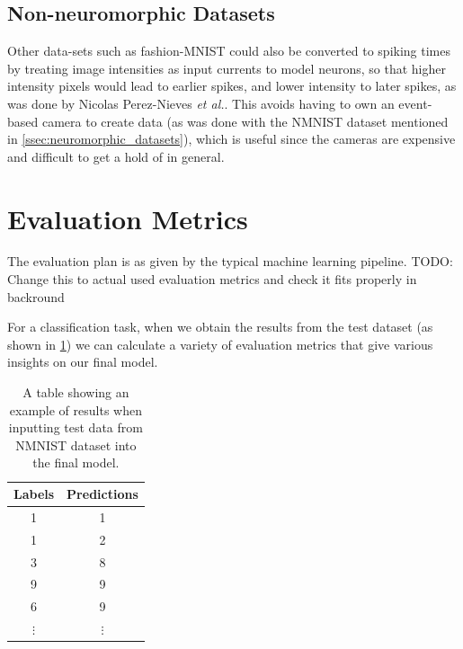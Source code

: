 \subsection{Non-neuromorphic Datasets}

Other data-sets such as fashion-MNIST could also be converted to spiking times by treating image intensities as input currents to model neurons, so that higher intensity pixels would lead to earlier spikes, and lower intensity to later spikes, as was done by Nicolas Perez-Nieves \textit{et al.}\cite{NeuralHetroPromRobLearn}. This avoids having to own an event-based camera to create data (as was done with the NMNIST dataset mentioned in \cref{ssec:neuromorphic_datasets}), which is useful since the cameras are expensive and difficult to get a hold of in general.

\section{Evaluation Metrics} \label{sec:evalutaion_metrics}

The evaluation plan is as given by the typical machine learning pipeline\cite{IntroToML}. \color{red} TODO: Change this to actual used evaluation metrics and check it fits properly in backround \color{black}

For a classification task, when we obtain the results from the test dataset (as shown in \cref{tab:possible_results}) we can calculate a variety of evaluation metrics that give various insights on our final model.

\begin{table}[htb]
    \centering
    \begin{tabular}{|| c  | c ||}
        \hline
        Labels     & Predictions \\
        \hline \hline
        1          & 1           \\
        \hline
        1          & 2           \\
        \hline
        3          & 8           \\
        \hline
        9          & 9           \\
        \hline
        6          & 9           \\
        \hline
        $ \vdots $ & $ \vdots $  \\
    \end{tabular}
    \caption{A table showing an example of results when inputting test data from NMNIST dataset\cite{NMNIST} into the final model.}
    \label{tab:possible_results}
\end{table}

